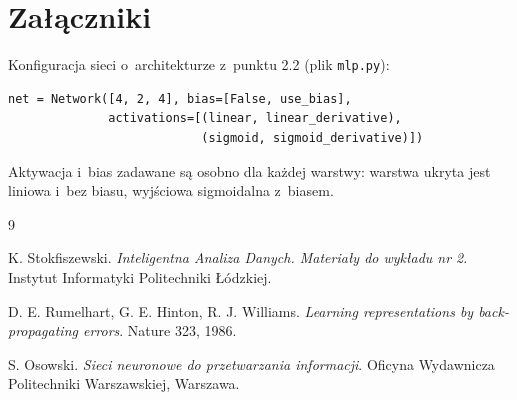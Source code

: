 \documentclass[12pt]{article}
\begin{document}
\section{Załączniki}

Konfiguracja sieci o~architekturze z~punktu 2.2 (plik \texttt{mlp.py}):

\begin{verbatim}
net = Network([4, 2, 4], bias=[False, use_bias],
              activations=[(linear, linear_derivative),
                           (sigmoid, sigmoid_derivative)])
\end{verbatim}

Aktywacja i~bias zadawane są osobno dla każdej warstwy: warstwa ukryta jest
liniowa i~bez biasu, wyjściowa sigmoidalna z~biasem.

\begin{thebibliography}{9}

K. Stokfiszewski.
\textit{Inteligentna Analiza Danych. Materiały do wykładu nr 2}.
Instytut Informatyki Politechniki Łódzkiej.

D. E. Rumelhart, G. E. Hinton, R. J. Williams.
\textit{Learning representations by back-propagating errors}.
Nature 323, 1986.

S. Osowski.
\textit{Sieci neuronowe do przetwarzania informacji}.
Oficyna Wydawnicza Politechniki Warszawskiej, Warszawa.

\end{thebibliography}
\end{document}
